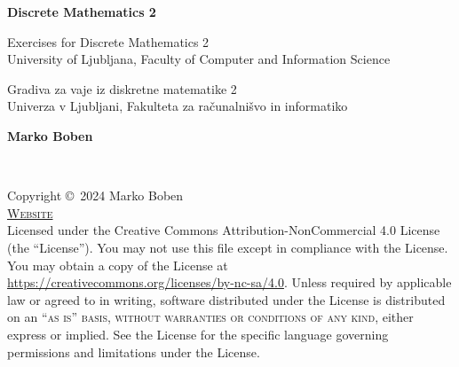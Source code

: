 \documentclass[
	11pt, %
	fleqn, %
	a4paper, %
]{LegrandOrangeBook}
\begin{document}

\titlepage %
    {\makebox[\paperwidth]{}}
	{ %
		\centering\sffamily %
		{\Huge\bfseries Discrete Mathematics 2\par} %
		\vspace{16pt} %
		{\LARGE Exercises for Discrete Mathematics 2\\[1mm] University of Ljubljana, Faculty of Computer and Information Science \par}

		\vspace{16pt}
		{\Large Gradiva za vaje iz diskretne matematike 2\\[1mm] Univerza v Ljubljani, Fakulteta za računalnišvo in informatiko \par
		} %
		\vspace{24pt} %
		{\huge\bfseries Marko Boben\par} %
	}


\thispagestyle{empty} %

~\vfill %

\noindent Copyright \copyright\ 2024 Marko Boben\\ %


\noindent \textsc{\href{https://www.fri.uni-lj.si/markobob/dm2-book.pdf}{Website}}\\ %

\noindent Licensed under the Creative Commons Attribution-NonCommercial 4.0 License (the ``License''). You may not use this file except in compliance with the License. You may obtain a copy of the License at \url{https://creativecommons.org/licenses/by-nc-sa/4.0}. Unless required by applicable law or agreed to in writing, software distributed under the License is distributed on an \textsc{``as is'' basis, without warranties or conditions of any kind}, either express or implied. See the License for the specific language governing permissions and limitations under the License.\\ %
\end{document}
